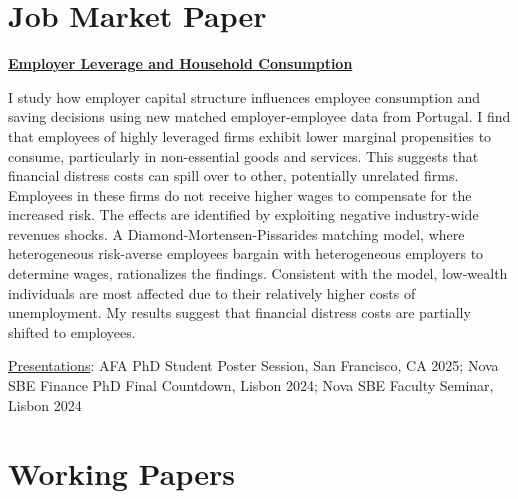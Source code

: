 \documentclass[letterpaper]{article}
\newenvironment{itemize*}{
  \begin{list}{}{
    \setlength{\leftmargin}{1.5em}
  }
}{
  \end{list}
}
\begin{document}
\section*{Job Market Paper}
\vspace{-0.2in}
\hrulefill
\begin{itemize*}
\item \href{https://miguelcfoliveira.github.io/Papers/Homemade_Unleverage.pdf}{\color{blue}\textbf{Employer Leverage and Household Consumption}}
\item I study how employer capital structure influences employee consumption and saving decisions using new matched employer-employee data from Portugal. I find that employees of highly leveraged firms exhibit lower marginal propensities to consume, particularly in non-essential goods and services. This suggests that financial distress costs can spill over to other, potentially unrelated firms. Employees in these firms do not receive higher wages to compensate for the increased risk. The effects are identified by exploiting negative industry-wide revenues shocks. A Diamond-Mortensen-Pissarides matching model, where heterogeneous risk-averse employees bargain with heterogeneous employers to determine wages, rationalizes the findings. Consistent with the model, low-wealth individuals are most affected due to their relatively higher costs of unemployment. My results suggest that financial distress costs are partially shifted to employees.

\underline{Presentations}: AFA PhD Student Poster Session, San Francisco, CA 2025; Nova SBE Finance PhD Final Countdown, Lisbon 2024; Nova SBE Faculty Seminar, Lisbon 2024
\end{itemize*}

\section*{Working Papers}
\vspace{-0.2in}
\hrulefill
\end{document}
